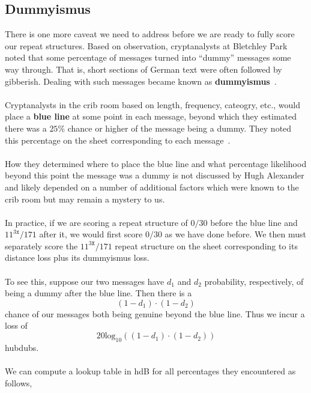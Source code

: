 \subsection{Dummyismus}
There is one more caveat we need to address before we are ready to
fully score our repeat structures. Based on observation,
cryptanalysts at Bletchley Park noted that some percentage of
messages turned into ``dummy'' messages some way through. That is,
short sections of German text were often followed by gibberish. Dealing with
such messages became known as {\bf{dummyismus}}~\cite[Section 4.4]{Hosgood2007}.
\\\\Cryptanalysts in the crib room  based on length, frequency,
cateogry, etc., would place a {\bf{blue line}} at some point in
each message, beyond which they estimated there was a $25\%$ chance
or higher of the message being a dummy. They noted this
percentage on the sheet corresponding to each message~\cite[p.~104]{Alexander1945}.
\\\\How they determined where to place the blue line and what
percentage likelihood beyond this point the message was a dummy is
not discussed by Hugh Alexander and likely depended on a number of
additional factors which were known to the crib room but may remain
a mystery to us.
\\\\In practice, if we are scoring a repeat structure of $0/30$
before the blue line and $11^{3\texttt{x}}/171$ after it, we would
first score $0/30$ as we have done before. We then must separately score the
$11^{3\texttt{X}}/171$ repeat structure on the sheet corresponding to
its distance
loss plus its dummyismus loss.
\\\\To see this, suppose our two messages have $d_1$ and $d_2$
probability, respectively, of being a dummy after the blue line. Then there is a
\[
  (1-d_1)\cdot(1-d_2)
\]
chance of our messages both being genuine beyond the blue line. Thus
we incur a loss of
\[
  20\text{log}_{10}((1-d_1)\cdot(1-d_2))
\]
hubdubs.
\\\\We can compute a lookup table in hdB for all percentages they
encountered as follows,
